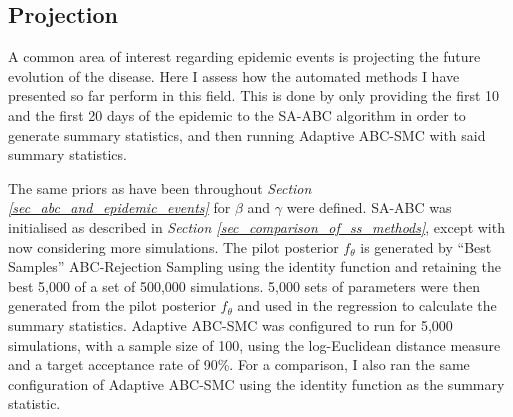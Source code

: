 \documentclass[11pt,a4paper]{article}
\theoremstyle{break}
\begin{document}
\subsection{Projection}\label{sec_projection}

  \par A common area of interest regarding epidemic events is projecting the future evolution of the disease. Here I assess how the automated methods I have presented so far perform in this field. This is done by only providing the first 10 and the first 20 days of the epidemic to the SA-ABC algorithm in order to generate summary statistics, and then running Adaptive ABC-SMC with said summary statistics.

  \par The same priors as have been throughout \textit{Section \ref{sec_abc_and_epidemic_events}} for $\beta$ and $\gamma$ were defined. SA-ABC was initialised as described in \textit{Section \ref{sec_comparison_of_ss_methods}}, except with now considering more simulations. The pilot posterior $f_{\theta}$ is generated by ``Best Samples'' ABC-Rejection Sampling using the identity function and retaining the best 5,000 of a set of 500,000 simulations. 5,000 sets of parameters were then generated from the pilot posterior $f_\theta$ and used in the regression to calculate the summary statistics. Adaptive ABC-SMC was configured to run for 5,000 simulations, with a sample size of 100, using the log-Euclidean distance measure and a target acceptance rate of 90\%. For a comparison, I also ran
  the same configuration of Adaptive ABC-SMC using the identity function as the summary statistic.
\end{document}
